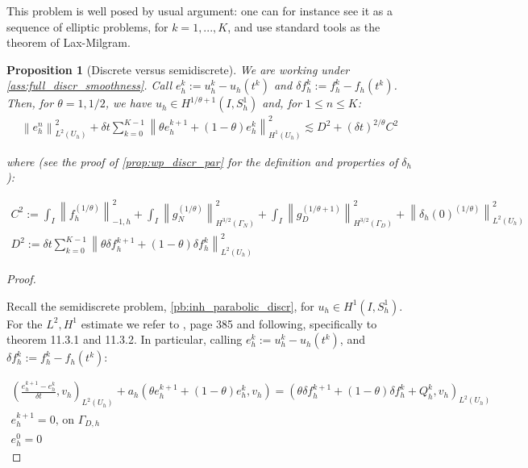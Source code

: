 \documentclass[english,a4paper,9pt,oneside]{scrbook}	%
\theoremstyle{break}
\newtheorem{prop}[equation]{Proposition}
\newenvironment{mproof}[1][\proofname]{%
  \begin{proof}[#1]$ $\par\nobreak\ignorespaces
}{%
  \end{proof}
}
\renewcommand*{\proofname}{Proof}
\theoremstyle{remark}
\newcommand{\ds}{\displaystyle}
\newcommand{\norm}[1]{\left\lVert#1\right\rVert}
\begin{document}
\begin{appendices}
This problem is well posed by usual argument: one can for instance see it as a sequence of elliptic problems, for $k = 1, ..., K$, and use standard tools as the theorem of Lax-Milgram.

\begin{prop}[Discrete versus semidiscrete]
\label{prop:d_vd_sd}
We are working under \cref{ass:full_discr_smoothness}.
Call $e_h^k:=u_h^k-u_h(t^k)$ and $\delta f_h^k:=f_h^k-f_h(t^k)$. Then, for $\theta=1, 1/2$, we have $u_h \in H^{1/\theta+1}(I, S^1_h)$ and, for $1\leq n \leq K$:
\begin{align*}
 \norm{e_{h}^{n}}_{L^2(U_h)}^2 + \delta t \sum_{k=0}^{K-1}\norm{\theta e_h^{k+1}+(1-\theta)e^k_h}_{H^1(U_h)}^2 \lesssim 
D^2 + (\delta t)^{2/\theta} C^2
\end{align*}

where (see the proof of \cref{prop:wp_discr_par} for the definition and properties of $\delta_h$):

\begin{align*}
C^2:=\ds \int_I \norm{f^{(1/\theta)}_h}_{-1,h}^2+\int_I\norm{ g_{N}^{(1/\theta)}}_{H^{3/2}(\Gamma_{N})}^2 + \int_I\norm{g_D^{(1/\theta+1)}}_{H^{3/2}(\Gamma_D)}^2 + \norm{\delta_{h}(0)^{(1/\theta)}}_{L^2(U_h)}^2\\
\ds D^2:= \ds {\delta t\sum_{k=0}^{K-1} \norm{\theta \delta f_h^{k+1}+(1-\theta)\delta f_h^k}_{L^2(U_h)}^2}
\end{align*}
\end{prop}


\begin{mproof}

Recall the semidiscrete problem, \cref{pb:inh_parabolic_discr}, for  $u_h \in H^1(I, S^1_h)$. For the $L^2, H^1$ estimate we refer to \cite{quarteroni}, page 385 and following, specifically to theorem 11.3.1 and 11.3.2. In particular, calling $e_h^k:=u_h^k-u_h(t^k)$, and $\delta f_h^k:=f_h^k-f_h(t^k)$:

\begin{align}
\label{eqn:discr_err}
\left ( \frac{e_{h}^{k+1}-e_h^k}{\delta t}, v_h\right)_{L^2(U_h)} + a_h(\theta e_h^{k+1}+(1-\theta)e^k_h, v_h) = (\theta \delta f_h^{k+1}+(1-\theta)\delta f_h^k + Q_h^k, v_h)_{L^2(U_h)} \\
e_h^{k+1}=0  \text{,  on } \Gamma_{D,h}\\
e_h^0=0
\end{align}


\end{mproof}
\end{appendices}
\end{document}
